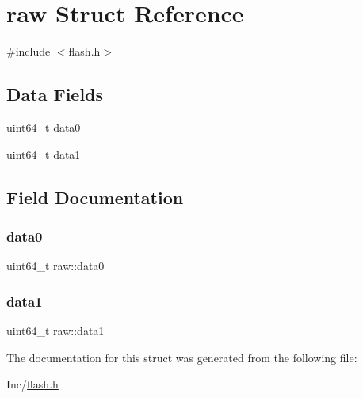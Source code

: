 \hypertarget{structraw}{}\section{raw Struct Reference}
\label{structraw}


{\ttfamily \#include $<$flash.\+h$>$}

\subsection*{Data Fields}
\begin{DoxyCompactItemize}
\item 
uint64\+\_\+t \hyperlink{structraw_a2f18e9a89654674d510f07247291918b}{data0}
\item 
uint64\+\_\+t \hyperlink{structraw_a5f1b9ca92b6c5e4a33278639879477d6}{data1}
\end{DoxyCompactItemize}


\subsection{Field Documentation}
\mbox{\label{structraw_a2f18e9a89654674d510f07247291918b}} 
\subsubsection{\texorpdfstring{data0}{data0}}
{\footnotesize\ttfamily uint64\+\_\+t raw\+::data0}

\mbox{\label{structraw_a5f1b9ca92b6c5e4a33278639879477d6}} 
\subsubsection{\texorpdfstring{data1}{data1}}
{\footnotesize\ttfamily uint64\+\_\+t raw\+::data1}



The documentation for this struct was generated from the following file\+:\begin{DoxyCompactItemize}
\item 
Inc/\hyperlink{flash_8h}{flash.\+h}\end{DoxyCompactItemize}
